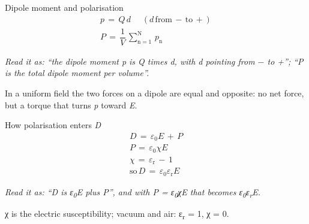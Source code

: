 \documentclass[11pt]{article}
\begin{document}
\begin{keepsection}
\begin{keepsection}
\begin{equationcard}{Dipole moment and polarisation}
\[ \begin{gathered} {p}\, =\, {Q\,d}\, \quad \, ({d}\, \text{from}\, -\, \text{to}\, +) \\ {P}\, =\, \dfrac{1}{{V}}\, \sum_{\mathrm{n}=1}^{\mathrm{N}} \, {p}_{\mathrm{n}} \end{gathered} \]
{\small \emph{Read it as: “the dipole moment p is Q times d, with d pointing from \ensuremath{-} to +”; “P is the total dipole moment per volume”.}\par In a uniform field the two forces on a dipole are equal and opposite: no net force, but a torque that turns \textit{p} toward \textit{E}.}
\end{equationcard}

\begin{equationcard}{How polarisation enters \textit{D}}
\[ \begin{gathered} {D}\, =\, ε_{0}{E}\, +\, {P} \\ {P}\, =\, ε_{0}χ{E} \\ χ\, =\, ε_{\mathrm{r}}\, -\, 1 \\ \text{so}\, {D}\, =\, ε_{0}ε_{\mathrm{r}}{E} \end{gathered} \]
{\small \emph{Read it as: “D is ε\textsubscript{0}E plus P”, and with P = ε\textsubscript{0}χE that becomes ε\textsubscript{0}ε\textsubscript{r}E.}\par χ is the electric susceptibility; vacuum and air: ε\textsubscript{r} = 1, χ = 0.}
\end{equationcard}


\end{keepsection}
\end{keepsection}
\end{document}
